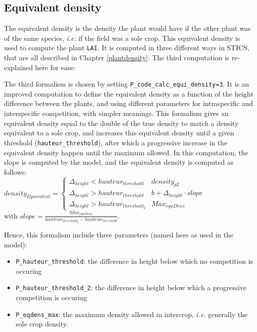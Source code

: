 \documentclass[
]{book}
\providecommand{\tightlist}{%
  \setlength{\itemsep}{0pt}\setlength{\parskip}{0pt}}
\begin{document}
\hypertarget{equivalent-density}{%
\subsection{Equivalent density}\label{equivalent-density}}

The equivalent density is the density the plant would have if the other plant was of the same species, \emph{i.e.} if the field was a sole crop. This equivalent density is used to compute the plant \texttt{LAI}. It is computed in three different ways in STICS, that are all described in Chapter \ref{plantdensity}. The third computation is re-explained here for ease:

The third formalism is chosen by setting \texttt{P\_code\_calc\_equi\_density=3}. It is an improved computation to define the equivalent density as a function of the height difference between the plants, and using different parameters for intraspecific and interspecific competition, with simpler meanings. This formalism gives an equivalent density equal to the double of the true density to match a density equivalent to a sole crop, and increases this equivalent density until a given threshold (\texttt{hauteur\_threshold}), after which a progressive increase in the equivalent density happen until the maximum allowed. In this computation, the slope is computed by the model, and the equivalent density is computed as follows:\\
\(density_{Equivalent} =\begin{cases}\Delta_{height} < hauteur_{threshold} & density_{p2} \\ \Delta_{height} > hauteur_{threshold} & b + \Delta_{height}\cdot slope \\ \Delta_{height} > hauteur_{threshold_2} & Max_{equDens} \end{cases}\)\\
with \(slope= \frac{Max_{equDens}}{hauteur_{threshold_2}-hauteur_{threshold}}\).

Hence, this formalism include three parameters (named here as used in the model):

\begin{itemize}
\tightlist
\item
  \texttt{P\_hauteur\_threshold}: the difference in height below which no competition is occuring
\item
  \texttt{P\_hauteur\_threshold\_2}: the difference in height below which a progressive competition is occuring
\item
  \texttt{P\_eqdens\_max}: the maximum density allowed in intercrop, \emph{i.e.} generally the sole crop density.
\end{itemize}
\end{document}
